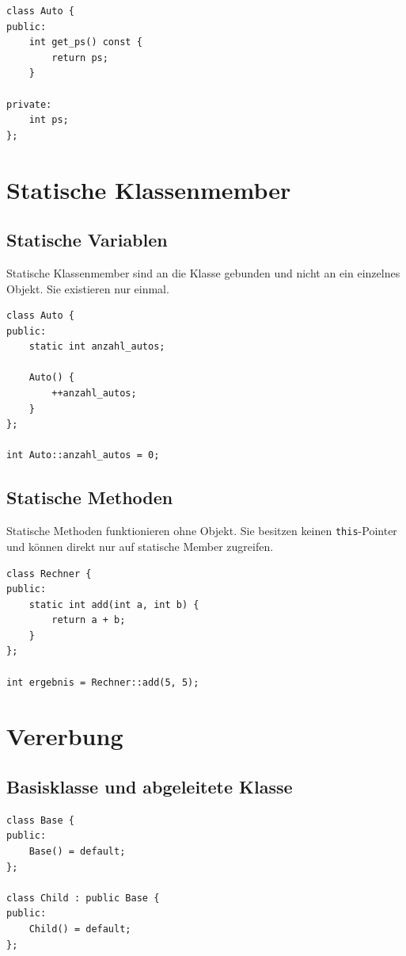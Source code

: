 \documentclass[11pt,a4paper]{article}
\newcommand{\code}[1]{\texttt{#1}}
\begin{document}
\begin{lstlisting}[caption={Konstante Memberfunktion}]
class Auto {
public:
    int get_ps() const {
        return ps;
    }

private:
    int ps;
};
\end{lstlisting}

\section{Statische Klassenmember}

\subsection{Statische Variablen}
Statische Klassenmember sind an die Klasse gebunden und nicht an ein einzelnes Objekt. Sie existieren nur einmal.

\begin{lstlisting}[caption={Statische Klassenvariable}]
class Auto {
public:
    static int anzahl_autos;

    Auto() {
        ++anzahl_autos;
    }
};

int Auto::anzahl_autos = 0;
\end{lstlisting}

\subsection{Statische Methoden}
Statische Methoden funktionieren ohne Objekt. Sie besitzen keinen \code{this}-Pointer und können direkt nur auf statische Member zugreifen.

\begin{lstlisting}[caption={Statische Methode}]
class Rechner {
public:
    static int add(int a, int b) {
        return a + b;
    }
};

int ergebnis = Rechner::add(5, 5);
\end{lstlisting}

\section{Vererbung}

\subsection{Basisklasse und abgeleitete Klasse}
\begin{lstlisting}[caption={Einfache Vererbung}]
class Base {
public:
    Base() = default;
};

class Child : public Base {
public:
    Child() = default;
};
\end{lstlisting}
\end{document}
